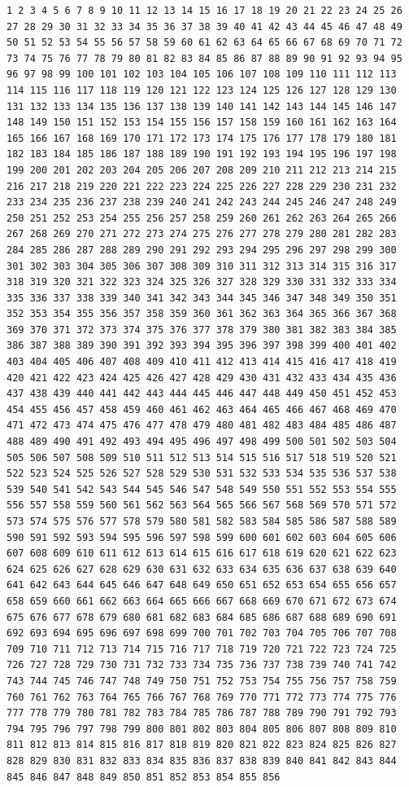 \documentclass[
  letterpaper,
]{scrbook}
\begin{document}
\begin{verbatim}
1 2 3 4 5 6 7 8 9 10 11 12 13 14 15 16 17 18 19 20 21 22 23 24 25 26 27 28 29 30 31 32 33 34 35 36 37 38 39 40 41 42 43 44 45 46 47 48 49 50 51 52 53 54 55 56 57 58 59 60 61 62 63 64 65 66 67 68 69 70 71 72 73 74 75 76 77 78 79 80 81 82 83 84 85 86 87 88 89 90 91 92 93 94 95 96 97 98 99 100 101 102 103 104 105 106 107 108 109 110 111 112 113 114 115 116 117 118 119 120 121 122 123 124 125 126 127 128 129 130 131 132 133 134 135 136 137 138 139 140 141 142 143 144 145 146 147 148 149 150 151 152 153 154 155 156 157 158 159 160 161 162 163 164 165 166 167 168 169 170 171 172 173 174 175 176 177 178 179 180 181 182 183 184 185 186 187 188 189 190 191 192 193 194 195 196 197 198 199 200 201 202 203 204 205 206 207 208 209 210 211 212 213 214 215 216 217 218 219 220 221 222 223 224 225 226 227 228 229 230 231 232 233 234 235 236 237 238 239 240 241 242 243 244 245 246 247 248 249 250 251 252 253 254 255 256 257 258 259 260 261 262 263 264 265 266 267 268 269 270 271 272 273 274 275 276 277 278 279 280 281 282 283 284 285 286 287 288 289 290 291 292 293 294 295 296 297 298 299 300 301 302 303 304 305 306 307 308 309 310 311 312 313 314 315 316 317 318 319 320 321 322 323 324 325 326 327 328 329 330 331 332 333 334 335 336 337 338 339 340 341 342 343 344 345 346 347 348 349 350 351 352 353 354 355 356 357 358 359 360 361 362 363 364 365 366 367 368 369 370 371 372 373 374 375 376 377 378 379 380 381 382 383 384 385 386 387 388 389 390 391 392 393 394 395 396 397 398 399 400 401 402 403 404 405 406 407 408 409 410 411 412 413 414 415 416 417 418 419 420 421 422 423 424 425 426 427 428 429 430 431 432 433 434 435 436 437 438 439 440 441 442 443 444 445 446 447 448 449 450 451 452 453 454 455 456 457 458 459 460 461 462 463 464 465 466 467 468 469 470 471 472 473 474 475 476 477 478 479 480 481 482 483 484 485 486 487 488 489 490 491 492 493 494 495 496 497 498 499 500 501 502 503 504 505 506 507 508 509 510 511 512 513 514 515 516 517 518 519 520 521 522 523 524 525 526 527 528 529 530 531 532 533 534 535 536 537 538 539 540 541 542 543 544 545 546 547 548 549 550 551 552 553 554 555 556 557 558 559 560 561 562 563 564 565 566 567 568 569 570 571 572 573 574 575 576 577 578 579 580 581 582 583 584 585 586 587 588 589 590 591 592 593 594 595 596 597 598 599 600 601 602 603 604 605 606 607 608 609 610 611 612 613 614 615 616 617 618 619 620 621 622 623 624 625 626 627 628 629 630 631 632 633 634 635 636 637 638 639 640 641 642 643 644 645 646 647 648 649 650 651 652 653 654 655 656 657 658 659 660 661 662 663 664 665 666 667 668 669 670 671 672 673 674 675 676 677 678 679 680 681 682 683 684 685 686 687 688 689 690 691 692 693 694 695 696 697 698 699 700 701 702 703 704 705 706 707 708 709 710 711 712 713 714 715 716 717 718 719 720 721 722 723 724 725 726 727 728 729 730 731 732 733 734 735 736 737 738 739 740 741 742 743 744 745 746 747 748 749 750 751 752 753 754 755 756 757 758 759 760 761 762 763 764 765 766 767 768 769 770 771 772 773 774 775 776 777 778 779 780 781 782 783 784 785 786 787 788 789 790 791 792 793 794 795 796 797 798 799 800 801 802 803 804 805 806 807 808 809 810 811 812 813 814 815 816 817 818 819 820 821 822 823 824 825 826 827 828 829 830 831 832 833 834 835 836 837 838 839 840 841 842 843 844 845 846 847 848 849 850 851 852 853 854 855 856 
\end{verbatim}
\end{document}
